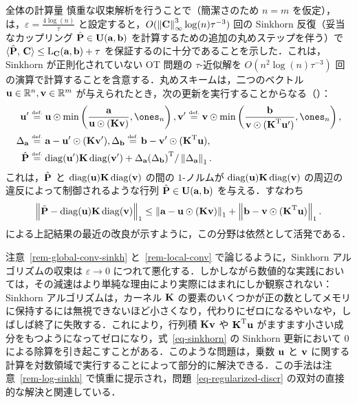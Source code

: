 \begin{rem1}{全体の計算量}\label{rem-complexity-rounding}
	慎重な収束解析を行うことで（簡潔さのため $n=m$ を仮定），\citet{altschuler2017near} は，$\varepsilon = \frac{4\log(n)}{\tau}$ と設定すると，$O(\norm{\C}_\infty^3 \log(n) \tau^{-3})$ 回の Sinkhorn 反復（妥当なカップリング $\hat \P \in \CouplingsD(\a,\b)$ を計算するための追加の丸めステップを伴う）で $\dotp{\hat \P}{\C} \leq \MKD_{\C}(\a,\b) + \tau$ を保証するのに十分であることを示した．これは，Sinkhorn が正則化されていない OT 問題の $\tau$-近似解を $O(n^2\log(n) \tau^{-3})$ 回の演算で計算することを含意する．丸めスキームは，二つのベクトル $\uD\in\RR^n,\vD\in\RR^m$ が与えられたとき，次の更新を実行することからなる（\cite[Alg. 2]{altschuler2017near}）：
	$$\begin{aligned}
		\uD'& \eqdef \uD\odot\min\left(\frac{\a}{\uD\odot(\K\vD)},\ones_n\right),
		\vD' \eqdef \vD\odot \min\left(\frac{\b}{\vD\odot(\transp{\K}\uD')},\ones_n\right), \\
	\Delta_{\a}& \eqdef \a- \uD'\odot (\K \vD'), \Delta_{\b} \eqdef \b- \vD'\odot (\transp{\K} \uD), \\
	\hat\P& \eqdef \diag(\uD')\K\diag(\vD')+\Delta_{\a} \transp{(\Delta_{\b})}/\norm{\Delta_{\a}}_1.
	\end{aligned}$$
	これは，$\hat\P$ と $\diag(\uD)\K\diag(\vD)$ の間の $1$-ノルムが $\diag(\uD)\K\diag(\vD)$ の周辺の違反によって制御されるような行列 $\hat\P \in \CouplingsD(\a,\b)$ を与える．すなわち
	$$ \norm{\hat\P-\diag(\uD)\K\diag(\vD)}_1 \leq \norm{\a-\uD\odot(\K\vD)}_1+\norm{\b-\vD\odot(\transp{\K}\uD)}_1.$$
\citet{pmlr-v80-dvurechensky18a} による上記結果の最近の改良が示すように，この分野は依然として活発である．
\end{rem1}

\begin{rem}\label{rem-stability}
注意~\ref{rem-global-conv-sinkh} と~\ref{rem-local-conv} で論じるように，Sinkhorn アルゴリズムの収束は $\varepsilon\rightarrow 0$ につれて悪化する．しかしながら数値的な実践においては，その減速はより単純な理由により実際にはまれにしか観察されない：Sinkhorn アルゴリズムは，カーネル $\K$ の要素のいくつかが正の数としてメモリに保持するには無視できないほど小さくなり，代わりにゼロになるやいなや，しばしば終了に失敗する．これにより，行列積 $\K\vD$ や $\transp{\K}\uD$ がますます小さい成分をもつようになってゼロになり，式~\eqref{eq-sinkhorn} の Sinkhorn 更新において $0$ による除算を引き起こすことがある．このような問題は，乗数 $\uD$ と $\vD$ に関する計算を対数領域で実行することによって部分的に解決できる．この手法は注意~\ref{rem-log-sinkh} で慎重に提示され，問題~\eqref{eq-regularized-discr} の双対の直接的な解決と関連している．
\end{rem}

